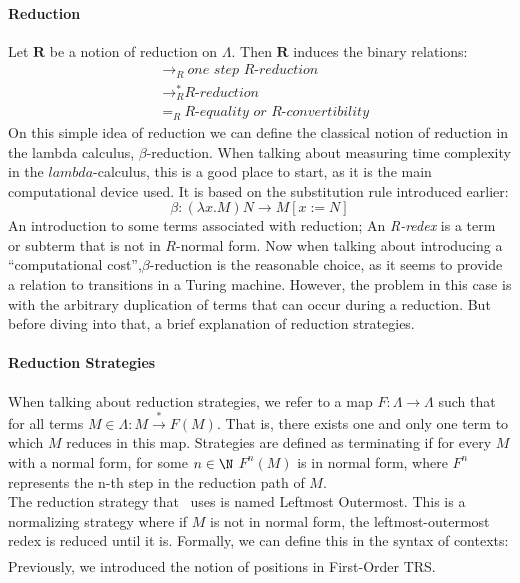\documentclass[12pt]{article}
\begin{document}
\paragraph{Reduction} Let $\textbf{R}$ be a notion of reduction on $\Lambda$. Then $\textbf{R}$ induces the binary relations:
\begin{equation}
  \begin{split}
          &{\rightarrow}_{R} \ \textit{one step R-reduction} \\
          &\rightarrow_{R}^{*} \textit{R-reduction} \\
          &=_{R} \ \textit{R-equality or R-convertibility}
  \end{split}
\end{equation}
On this simple idea of reduction we can define the classical notion of reduction in the lambda calculus, $\beta$-reduction. When talking about measuring time complexity in the $lambda$-calculus, this is a good place to start, as it is the main computational device used.
It is based on the substitution rule introduced earlier:
\begin{equation}
  \beta : ( \lambda x.M ) N \rightarrow M [ x:=N ]
\end{equation}
An introduction to some terms associated with reduction; An \textit{R-redex} is a term or subterm that is not in $R$-normal form.
Now when talking about introducing a \enquote{computational cost},$\beta$-reduction is the reasonable choice, as it seems to provide a relation to transitions in a Turing machine. However, the problem in this case is with the arbitrary duplication of terms that can occur during a reduction.
But before diving into that, a brief explanation of reduction strategies.
\paragraph{Reduction Strategies}
When talking about reduction strategies, we refer to a map $F : \Lambda \rightarrow \Lambda$ such that for all terms $M \in \Lambda : M \xrightarrow{*} F(M)$. That is, there exists one and only one term to which $M$ reduces in this map. Strategies are defined as terminating if for every $M$ with a normal form, for some $n \in \N$ $F^{n}(M)$ is in normal form, where $F^{{n}}$ represents the n-th step in the reduction path of $M$. \\
The reduction strategy that~\cite{beta-invariance} uses is named Leftmost Outermost. This is a normalizing strategy where if $M$ is not in normal form, the leftmost-outermost redex is reduced until it is. Formally, we can define this in the syntax of contexts:
\begin{equation}
  \begin{split}
  \end{split}
\end{equation}
Previously, we introduced the notion of positions in First-Order TRS.
\end{document}

